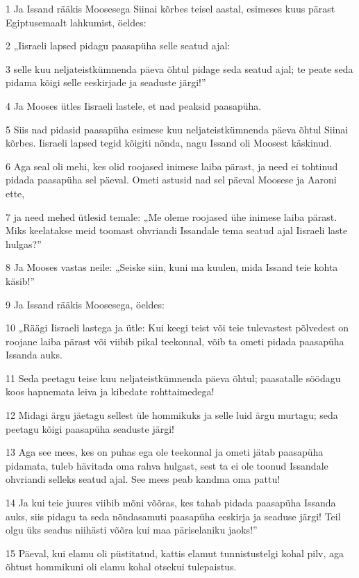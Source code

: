 \par 1 Ja Issand rääkis Moosesega Siinai kõrbes teisel aastal, esimeses kuus pärast Egiptusemaalt lahkumist, öeldes:
\par 2 „Iisraeli lapsed pidagu paasapüha selle seatud ajal:
\par 3 selle kuu neljateistkümnenda päeva õhtul pidage seda seatud ajal; te peate seda pidama kõigi selle eeskirjade ja seaduste järgi!”
\par 4 Ja Mooses ütles Iisraeli lastele, et nad peaksid paasapüha.
\par 5 Siis nad pidasid paasapüha esimese kuu neljateistkümnenda päeva õhtul Siinai kõrbes. Iisraeli lapsed tegid kõigiti nõnda, nagu Issand oli Moosest käskinud.
\par 6 Aga seal oli mehi, kes olid roojased inimese laiba pärast, ja need ei tohtinud pidada paasapüha sel päeval. Ometi astusid nad sel päeval Moosese ja Aaroni ette,
\par 7 ja need mehed ütlesid temale: „Me oleme roojased ühe inimese laiba pärast. Miks keelatakse meid toomast ohvriandi Issandale tema seatud ajal Iisraeli laste hulgas?”
\par 8 Ja Mooses vastas neile: „Seiske siin, kuni ma kuulen, mida Issand teie kohta käsib!”
\par 9 Ja Issand rääkis Moosesega, öeldes:
\par 10 „Räägi Iisraeli lastega ja ütle: Kui keegi teist või teie tulevastest põlvedest on roojane laiba pärast või viibib pikal teekonnal, võib ta ometi pidada paasapüha Issanda auks.
\par 11 Seda peetagu teise kuu neljateistkümnenda päeva õhtul; paasatalle söödagu koos hapnemata leiva ja kibedate rohttaimedega!
\par 12 Midagi ärgu jäetagu sellest üle hommikuks ja selle luid ärgu murtagu; seda peetagu kõigi paasapüha seaduste järgi!
\par 13 Aga see mees, kes on puhas ega ole teekonnal ja ometi jätab paasapüha pidamata, tuleb hävitada oma rahva hulgast, sest ta ei ole toonud Issandale ohvriandi selleks seatud ajal. See mees peab kandma oma pattu!
\par 14 Ja kui teie juures viibib mõni võõras, kes tahab pidada paasapüha Issanda auks, siis pidagu ta seda nõndasamuti paasapüha eeskirja ja seaduse järgi! Teil olgu üks seadus niihästi võõra kui maa päriselaniku jaoks!”
\par 15 Päeval, kui elamu oli püstitatud, kattis elamut tunnistustelgi kohal pilv, aga õhtust hommikuni oli elamu kohal otsekui tulepaistus.
